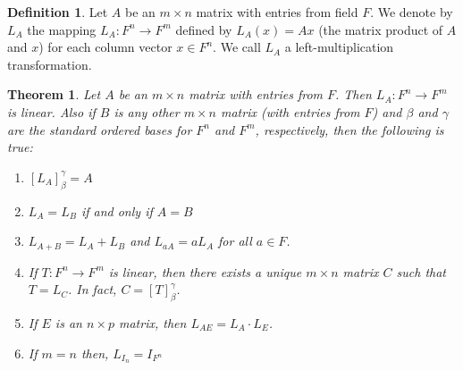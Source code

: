 \documentclass[12pt, a4paper]{article}
\newtheorem{theorem}{Theorem}[section]
\theoremstyle{definition}
\newtheorem{definition}{Definition}[section]
\theoremstyle{remark}
\begin{document}
\begin{definition}
    Let $A$ be an $m \times n$ matrix with entries from field $F$. We denote by $L_A$ the mapping $L_A:F^n \to F^m$ defined by $L_A(x) = Ax$ (the matrix product of $A$ and $x$) for each column vector $x \in F^n$. We call $L_A$ a left-multiplication transformation.
\end{definition}

\begin{theorem}
    Let $A$ be an $m \times n$ matrix with entries from $F$. Then $L_A : F^n \to F^m$ is linear. Also if $B$ is any other $m \times n$ matrix (with entries from $F$) and $\beta$ and $\gamma$ are the standard ordered bases for $F^n$ and $F^m$, respectively, then the following is true:

\begin{enumerate}
    \item $[L_A]_\beta^\gamma = A$
    \item $L_A = L_B$ if and only if $A = B$
    \item $L_{A+B} = L_A + L_B$ and $L_{aA} = aL_A$ for all $a \in F$.
    \item If $T: F^n \to F^m$ is linear, then there exists a unique $m \times n$ matrix $C$ such that $T = L_C$. In fact, $C = [T]_\beta^\gamma$.
    \item If $E$ is an $n \times p$ matrix, then $L_{AE} = L_A \cdot L_E$.
    \item If $m = n$ then, $L_{I_n} = I_{F^n}$
\end{enumerate}
\end{theorem}
\end{document}
